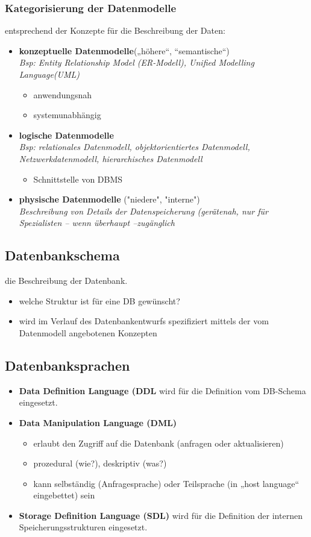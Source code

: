 \documentclass[10pt]{scrartcl}
\begin{document}
\subsubsection{Kategorisierung der Datenmodelle}
entsprechend der Konzepte für die Beschreibung der Daten:
\begin{itemize}
\item[] {\bf konzeptuelle Datenmodelle}(„höhere“, “semantische“)\\
{\it Bsp: Entity Relationship Model (ER-Modell), Unified Modelling Language(UML)}
\begin{itemize}
\item anwendungsnah
\item systemunabhängig
\end{itemize} 
\item[] {\bf logische Datenmodelle}\\
{\it Bsp: relationales Datenmodell, objektorientiertes Datenmodell,
Netzwerkdatenmodell, hierarchisches Datenmodell}
\begin{itemize}
\item Schnittstelle von DBMS
\end{itemize} 
\item[] {\bf physische Datenmodelle} ("niedere", "interne")\\
{\it Beschreibung von Details der Datenspeicherung (gerätenah, nur für Spezialisten -- wenn überhaupt --zugänglich}
\end{itemize}

\subsection{Datenbankschema}
die Beschreibung der Datenbank.
\begin{itemize}
\item welche Struktur ist für eine DB gewünscht?
\item wird im Verlauf des Datenbankentwurfs spezifiziert mittels der vom Datenmodell angebotenen Konzepten
\end{itemize}


\subsection{Datenbanksprachen}
\begin{itemize}
\item {\bf Data Definition Language (DDL } wird für die Definition vom DB-Schema eingesetzt.
\item {\bf Data Manipulation Language (DML)}
\begin{itemize}
\item erlaubt den Zugriff auf die Datenbank (anfragen oder aktualisieren)
\item prozedural (wie?), deskriptiv (was?)
\item kann selbständig (Anfragesprache) oder Teilsprache (in „host language“
eingebettet) sein
\end{itemize}
\item {\bf Storage Definition Language (SDL)} wird für die Definition der internen Speicherungsstrukturen eingesetzt.
\end{itemize}
\end{document}
